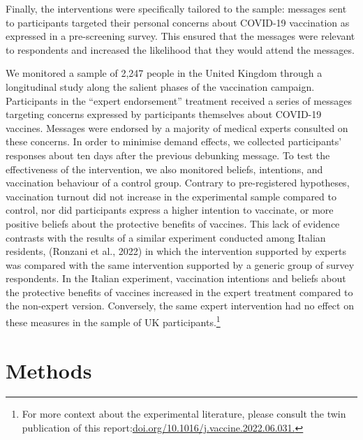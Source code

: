 \documentclass[authordate, empirical]{jote-new-article}
\begin{document}
Finally, the interventions were specifically tailored to the sample: messages sent to participants targeted their personal concerns about COVID-19 vaccination as expressed in a pre-screening survey. This ensured that the messages were relevant to respondents and increased the likelihood that they would attend the messages.



We monitored a sample of 2,247 people in the United Kingdom through a longitudinal study along the salient phases of the vaccination campaign. Participants in the “expert endorsement” treatment received a series of messages targeting concerns expressed by participants themselves about COVID-19 vaccines. Messages were endorsed by a majority of medical experts consulted on these concerns. In order to minimise demand effects, we collected participants' responses about ten days after the previous debunking message. To test the effectiveness of the intervention, we also monitored beliefs, intentions, and vaccination behaviour of a control group. Contrary to pre-registered hypotheses, vaccination turnout did not increase in the experimental sample compared to control, nor did participants express a higher intention to vaccinate, or more positive beliefs about the protective benefits of vaccines. This lack of evidence contrasts with the results of a similar experiment conducted among Italian residents, (Ronzani et al., 2022) in which the intervention supported by experts was compared with the same intervention supported by a generic group of survey respondents. In the Italian experiment, vaccination intentions and beliefs about the protective benefits of vaccines increased in the expert treatment compared to the non-expert version. Conversely, the same expert intervention had no effect on these measures in the sample of UK participants.\footnote{ For more context about the experimental literature, please consult the twin publication of this report:\href{https://doi.org/10.1016/j.vaccine.2022.06.031}{doi.org/10.1016/j.vaccine.2022.06.031.}}



\section{Methods}
\end{document}
